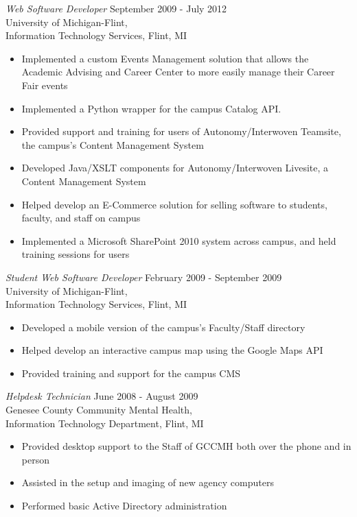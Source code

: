 \documentclass[line,margin]{res}
\begin{document}
\begin{resume}
    {\sl Web Software Developer }
            \hfill September 2009 - July 2012 \\
                   University of Michigan-Flint, \\
                   Information Technology Services, Flint, MI
        \begin{itemize}
            \item Implemented a custom Events Management solution that
                  allows the Academic Advising and Career Center to
                  more easily manage their Career Fair events
			\item Implemented a Python wrapper for the campus Catalog API.
            \item Provided support and training for users of Autonomy/Interwoven
                  Teamsite, the campus's Content Management System
            \item Developed Java/XSLT components for Autonomy/Interwoven Livesite, a
                  Content Management System
            \item Helped develop an E-Commerce solution for selling software
                  to students, faculty, and staff on campus
            \item Implemented a Microsoft SharePoint 2010 system across
                  campus, and held training sessions for users \\
        \end{itemize}

    {\sl Student Web Software Developer }
            \hfill February 2009 - September 2009 \\
                   University of Michigan-Flint, \\
                   Information Technology Services, Flint, MI
        \begin{itemize}
            \item Developed a mobile version of the campus's Faculty/Staff
                  directory
            \item Helped develop an interactive campus map using the
                  Google Maps API
            \item Provided training and support for the campus CMS
        \end{itemize}

    {\sl Helpdesk Technician}
            \hfill June 2008 - August 2009 \\
                   Genesee County Community Mental Health, \\
                   Information Technology Department, Flint, MI
        \begin{itemize}
            \item Provided desktop support to the Staff of GCCMH both
                  over the phone and in person
            \item Assisted in the setup and imaging of new agency
                  computers
            \item Performed basic Active Directory administration
        \end{itemize}



\end{resume}
\end{document}
